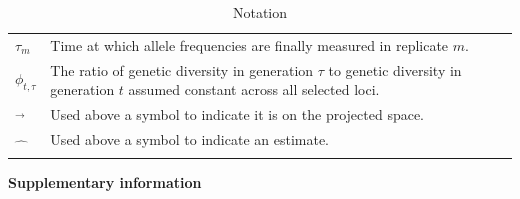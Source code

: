 \documentclass[12pt]{article}
\begin{document}
\begin{longtable}{|p{2cm}|p{13cm}|}
$\tau_m$&Time at which allele frequencies are finally measured in replicate $m$.\\
$\phi_{t,\tau}$&The ratio of genetic diversity in generation $\tau$ to genetic diversity in generation $t$ assumed constant across all selected loci.\\
$\overrightarrow{}$&Used above a symbol to indicate it is on the projected space.\\
$\widehat{\ \ \ \ }$&Used above a symbol to indicate an estimate.\\
\hline
\caption{Notation}
\label{tab:notation}
\end{longtable}

\newpage

\begin{center}
    {\Large \bf Supplementary information}
\end{center}
\end{document}
